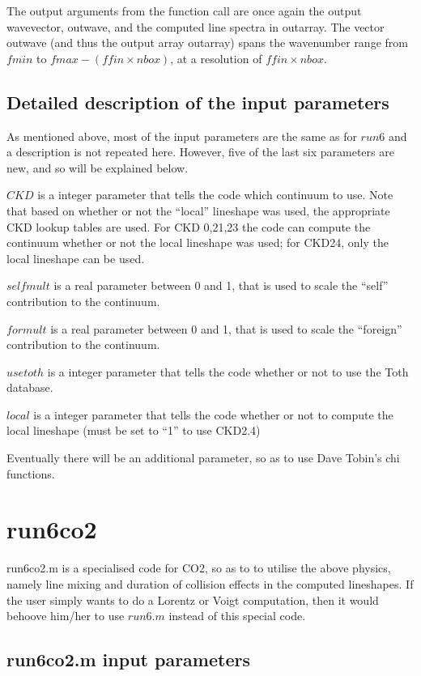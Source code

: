 \documentclass[11pt]{article}
\begin{document}
The output arguments from the function call are once again the output 
wavevector,  outwave, and the computed line spectra in outarray. The vector 
outwave (and thus the output array outarray) spans the wavenumber range 
from $fmin$ to $fmax-(ffin \times  nbox)$, at a resolution of 
$ffin \times nbox$.

\subsection{Detailed description of the input parameters}

As mentioned above, most of the input parameters are the same as for $run6$
and a description is not repeated here. However, five of the last six 
parameters are new, and so will be explained below.

$CKD$ is a integer parameter that tells the code which continuum to use. 
Note that based on whether or not the ``local'' lineshape was used, the 
appropriate CKD lookup tables are used. For CKD 0,21,23 the code can 
compute the continuum whether or not the local lineshape was used; for 
CKD24, only the local lineshape can be used.

$selfmult$ is a real parameter between 0 and 1, that is used to scale the
``self'' contribution to the continuum.

$formult$ is a real parameter between 0 and 1, that is used to scale the
``foreign'' contribution to the continuum.

$usetoth$ is a integer parameter that tells the code whether or not to use 
the Toth database.

$local$ is a integer parameter that tells the code whether or not to compute
the local lineshape (must be set to ``1'' to use CKD2.4)

Eventually there will be an additional parameter, so as to use Dave Tobin's
chi functions.
\section{run6co2}

run6co2.m is a specialised code for CO2, so as to to utilise the above 
physics, namely line mixing and duration of collision effects in the 
computed lineshapes. If the user simply wants to do a Lorentz or Voigt 
computation, then it would behoove him/her to use $run6.m$ instead of this 
special code.

\subsection{run6co2.m input parameters}
\end{document}

